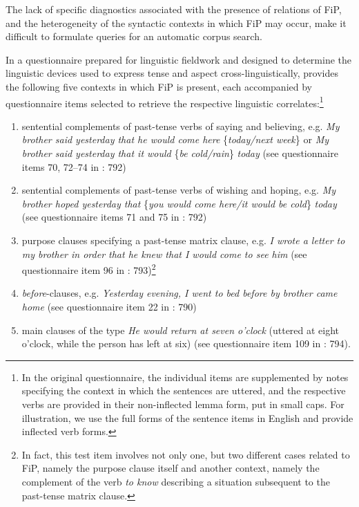 \documentclass[output=paper,colorlinks,citecolor=brown]{langscibook}
\begin{document}
The lack of specific diagnostics associated with the presence of relations of FiP, and the heterogeneity of the syntactic contexts in which FiP may occur, make it difficult to formulate queries for an automatic corpus search.

In a questionnaire prepared for linguistic fieldwork and designed to determine the linguistic devices used to express tense and aspect cross-linguistically, \citet[797]{Dahl2000} provides the following five contexts in which FiP is present, each accompanied by questionnaire items selected to retrieve the respective linguistic correlates:\footnote{In the original questionnaire, the individual items are supplemented by notes specifying the context in which the sentences are uttered, and the respective verbs are provided in their non-inflected lemma form, put in small caps. For illustration, we use the full forms of the sentence items in English and provide inflected verb forms.}

\begin{enumerate}[label=\alph*.]
    \item sentential complements of past-tense verbs of saying and believing, e.g. \textit{My brother said yesterday that he would come here }\{\textit{today/next week}\} or\textit{ My brother said yesterday that it would }\{\textit{be cold/rain}\}\textit{ today }(see questionnaire items 70, 72–74 in \cite{Dahl2000}: 792)

\item sentential complements of past-tense verbs of wishing and hoping, e.g. \textit{My brother hoped yesterday that} \{\textit{you would come here/it would be cold}\}\textit{ today }(see questionnaire items 71 and 75 in \cite{Dahl2000}: 792)

\item purpose clauses specifying a past-tense matrix clause, e.g. \textit{I wrote a letter to my brother in order that he knew that I would come to see him} (see questionnaire item 96 in \cite{Dahl2000}: 793)\footnote{In fact, this test item involves not only one, but two different cases related to FiP, namely the purpose clause itself and another context, namely the complement of the verb \textit{to know} describing a situation subsequent to the past-tense matrix clause.}

\item \textit{before}-clauses, e.g. \textit{Yesterday evening, I went to bed before by brother came home }(see questionnaire item 22 in \cite{Dahl2000}: 790)

\item main clauses of the type \textit{He would return at seven o’clock} (uttered at eight o’clock, while the person has left at six) (see questionnaire item 109 in \cite{Dahl2000}: 794).

\end{enumerate}
\end{document}
